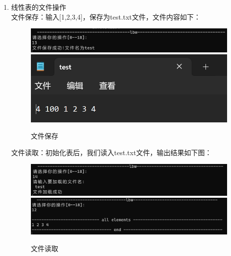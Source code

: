 \documentclass[supercite]{Experimental_Report}
\theoremstyle{definition}
\begin{document}
\begin{enumerate}
		\item 线性表的文件操作\\
		文件保存：输入[1,2,3,4]，保存为test.txt文件，文件内容如下：
		\begin{figure}[htbp]
			\centering
			\begin{minipage}{0.7\linewidth}
				\centering
				\includegraphics[width=0.9\linewidth]{images/文件操作成功.png}
				\includegraphics[width=0.9\linewidth]{images/文件操作结果.png}
			\end{minipage}
			\caption{文件保存}
			\label{fig1-34}
		\end{figure}
	
		文件读取：初始化表后，我们读入test.txt文件，输出结果如下图：
		\begin{figure}[htbp]
			\centering
			\begin{minipage}{0.7\linewidth}
				\centering
				\includegraphics[width=0.9\linewidth]{images/文件加载成功.png}
				\includegraphics[width=0.9\linewidth]{images/文件加载结果.png}
			\end{minipage}
			\caption{文件读取}
			\label{fig1-35}
		\end{figure}
	

\end{enumerate}
\end{document}
